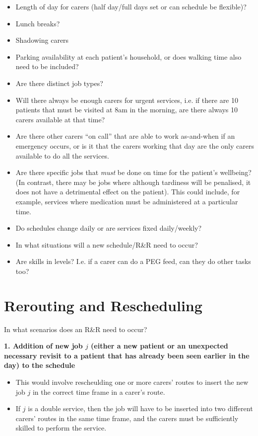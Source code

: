 \documentclass[a4paper]{article}
\begin{document}
\begin{itemize}[label=\textcolor{myRed}{\textbullet},leftmargin=*, itemsep=-0.1em]
	\item Length of day for carers (half day/full days set or can schedule be flexible)?
	\item Lunch breaks?
	\item Shadowing carers
	\item Parking availability at each patient's household, or does walking time also need to be included?
	\item Are there distinct job types?
	\item Will there always be enough carers for urgent services, i.e. if there are 10 patients that must be visited at 8am in the morning, are there always 10 carers available at that time?
	\item Are there other carers ``on call'' that are able to work as-and-when if an emergency occurs, or is it that the carers working that day are the only carers available to do all the services.
	\item Are there specific jobs that \emph{must} be done on time for the patient's wellbeing? (In contrast, there may be jobs where although tardiness will be penalised, it does not have a detrimental effect on the patient). This could include, for example, services where medication must be administered at a particular time.
	\item Do schedules change daily or are services fixed daily/weekly?
	\item In what situations will a new schedule/R\&R need to occur?
	\item Are skills in levels? I.e. if a carer can do a PEG feed, can they do other tasks too?
\end{itemize}

\section{Rerouting and Rescheduling}
\noindent In what scenarios does an R\&R need to occur?\vspace{3mm}

\noindent \textbf{1. Addition of new job $j$ (either a new patient or an unexpected necessary revisit to a patient that has already been seen earlier in the day) to the schedule}
\begin{itemize}[label=\textcolor{myRed}{\textbullet},leftmargin=*, itemsep=-0.1em]
	\item This would involve rescheulding one or more carers' routes to insert the new job $j$ in the correct time frame in a carer's route. 
	\item If $j$ is a double service, then the job will have to be inserted into two different carers' routes in the same time frame, and the carers must be sufficiently skilled to perform the service.
\end{itemize}
\end{document}
